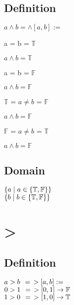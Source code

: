 \documentclass[11pt]{article}
\begin{document}
\subsection{Definition}
\begin{center}
$
a \land b = \land[a,b] :=
$
\end{center}
\vspace{2mm}
a = b = $\mathbb{T}$
\begin{center}
$
a \land b = \mathbb{T}
$
\end{center}
\vspace{2mm}
a = b = $\mathbb{F}$
\begin{center}
$
a \land b  = \mathbb{F}
$
\end{center}
\vspace{2mm}
$\mathbb{T}$ = $a \neq b$ = $\mathbb{F}$
\begin{center}
$
a \land b = \mathbb{F}
$
\end{center}
\vspace{2mm}
$\mathbb{F}$ = $a \neq b$ = $\mathbb{T}$
\begin{center}
$
a \land b = \mathbb{F}
$
\end{center}
\subsection{Domain}
\begin{center}
$
\{a \hspace{1mm} | \hspace{1mm} a \in \{\mathbb{T},\mathbb{F}\}\}
$
\\ \vspace{2mm}
$
\{b \hspace{1mm} | \hspace{1mm} b \in \{\mathbb{T},\mathbb{F}\}\}
$
\end{center}



\section{>}
\subsection{Definition}
\begin{center}
$
a > b \hspace{1.5mm} =\hspace{1.5mm} >[a,b] :=
$
\\ \vspace{2mm}
$
0 > 1\hspace{1.5mm} =\hspace{1.5mm} >[0,1] \rightarrow \mathbb{F} 
$
\\ \vspace{2mm}
$
1 > 0 \hspace{1.5mm}=\hspace{1.5mm} >[1,0] \rightarrow \mathbb{T} 
$
\end{center}
\end{document}
